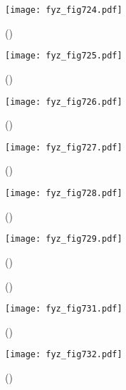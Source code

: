     \begin{figure}[ht!] %
      \centering
      \texttt{[image: fyz\_fig724.pdf]}
      \caption{
               (\cite[s.~707]{Feynman02})}
      \label{fyz:fig724}
    \end{figure}

    \begin{figure}[ht!] %
      \centering
      \texttt{[image: fyz\_fig725.pdf]}
      \caption{
               (\cite[s.~707]{Feynman02})}
      \label{fyz:fig725}
    \end{figure}

    \begin{figure}[ht!] %
      \centering
      \texttt{[image: fyz\_fig726.pdf]}
      \caption{
               (\cite[s.~707]{Feynman02})}
      \label{fyz:fig726}
    \end{figure}

    \begin{figure}[ht!] %
      \centering
      \texttt{[image: fyz\_fig727.pdf]}
      \caption{
               (\cite[s.~707]{Feynman02})}
      \label{fyz:fig727}
    \end{figure}

    \begin{figure}[ht!] %
      \centering
      \texttt{[image: fyz\_fig728.pdf]}
      \caption{
               (\cite[s.~707]{Feynman02})}
      \label{fyz:fig728}
    \end{figure}

    \begin{figure}[ht!] %
      \centering
      \texttt{[image: fyz\_fig729.pdf]}
      \caption{
               (\cite[s.~707]{Feynman02})}
      \label{fyz:fig729}
    \end{figure}

    \begin{figure}[ht!]
      \centering
                     \newline
      \label{fyz:fig730}
      \caption{
               (\cite[s.~748]{Feynman02})}
    \end{figure}

    \begin{figure}[ht!] %
      \centering
      \texttt{[image: fyz\_fig731.pdf]}
      \caption{
               (\cite[s.~707]{Feynman02})}
      \label{fyz:fig731}
    \end{figure}

    \begin{figure}[ht!] %
      \centering
      \texttt{[image: fyz\_fig732.pdf]}
      \caption{
               (\cite[s.~707]{Feynman02})}
      \label{fyz:fig732}
    \end{figure}

